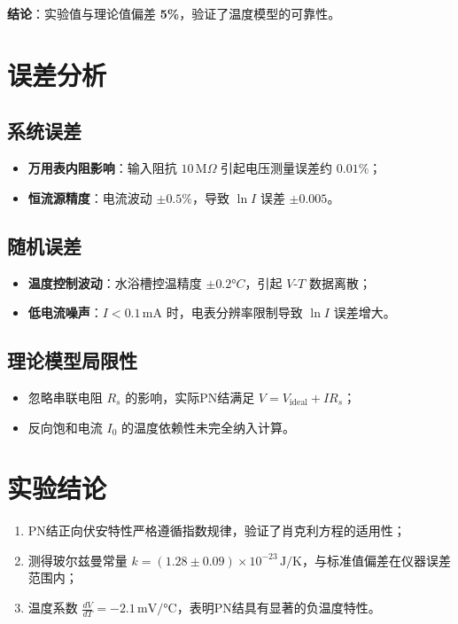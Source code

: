\documentclass[12pt,a4paper]{article}
\begin{document}
\textbf{结论}：实验值与理论值偏差 \textbf{5\%}，验证了温度模型的可靠性。

\section{误差分析}

\subsection{系统误差}

\begin{itemize}
\item \textbf{万用表内阻影响}：输入阻抗 $10 \, \text{M}\Omega$ 引起电压测量误差约 $0.01\%$；
\item \textbf{恒流源精度}：电流波动 $\pm 0.5\%$，导致 $\ln I$ 误差 $\pm 0.005$。
\end{itemize}

\subsection{随机误差}

\begin{itemize}
\item \textbf{温度控制波动}：水浴槽控温精度 $\pm 0.2°C$，引起 $V$-$T$ 数据离散；
\item \textbf{低电流噪声}：$I < 0.1 \, \text{mA}$ 时，电表分辨率限制导致 $\ln I$ 误差增大。
\end{itemize}

\subsection{理论模型局限性}

\begin{itemize}
\item 忽略串联电阻 $R_s$ 的影响，实际PN结满足 $V = V_{\text{ideal}} + I R_s$；
\item 反向饱和电流 $I_0$ 的温度依赖性未完全纳入计算。
\end{itemize}

\section{实验结论}

\begin{enumerate}
\item PN结正向伏安特性严格遵循指数规律，验证了肖克利方程的适用性；
\item 测得玻尔兹曼常量 $k = (1.28 \pm 0.09) \times 10^{-23} \, \text{J/K}$，与标准值偏差在仪器误差范围内；
\item 温度系数 $\frac{dV}{dT} = -2.1 \, \text{mV/°C}$，表明PN结具有显著的负温度特性。
\end{enumerate}
\end{document}
